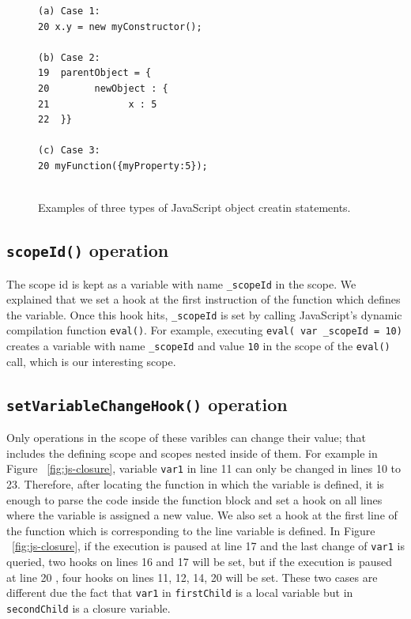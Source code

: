 \documentclass[preprint]{sigplanconf}
\begin{document}

\begin{figure}[htp]
\begin{verbatim}
(a) Case 1:
20 x.y = new myConstructor();

(b) Case 2:
19  parentObject = {
20   	  newObject : {
21  			x : 5
22  }}

(c) Case 3:
20 myFunction({myProperty:5});
 
\end{verbatim}
\caption{Examples of three types of JavaScript object creatin statements.}
\label{fig:objectCreation}
\end{figure}


\subsection{\texttt{scopeId()} operation}
The scope id is kept as a variable with name \texttt{\_scopeId} in the
scope. We explained that we set a hook at the first instruction of the
function which defines the variable. Once this hook hits,
\texttt{\_scopeId} is set by calling JavaScript's dynamic compilation function \texttt{eval()}. For
example, executing \texttt{eval( var \_scopeId = 10)} creates a
variable with name \texttt{\_scopeId} and value \texttt{10} in the
scope of the \texttt{eval()} call, which is our interesting scope.

\subsection{\texttt{setVariableChangeHook()} operation}
Only operations in the scope of these varibles can change their value; 
that includes the defining scope and scopes nested inside of them.
For example in Figure ~\ref{fig:js-closure}, variable \texttt{var1} in line 11 can only be
changed in lines 10 to 23. Therefore, after locating the function in
which the variable is defined, it is enough to parse the code inside
the function block and set a hook on all lines where the variable is
assigned a new value. 
We also set a hook at the first line of the function which is
corresponding to the line variable is defined. In Figure
~\ref{fig:js-closure}, if the execution is paused at line 17 and the
last change of \texttt{var1} is queried, two hooks on lines 16 and 17
will be set, but if the execution is paused at line 20 , four hooks on
lines 11, 12, 14, 20 will be set. These two cases are different due
the fact that \texttt{var1} in \texttt{firstChild} is a local variable
but in \texttt{secondChild} is a closure variable.
\end{document}
